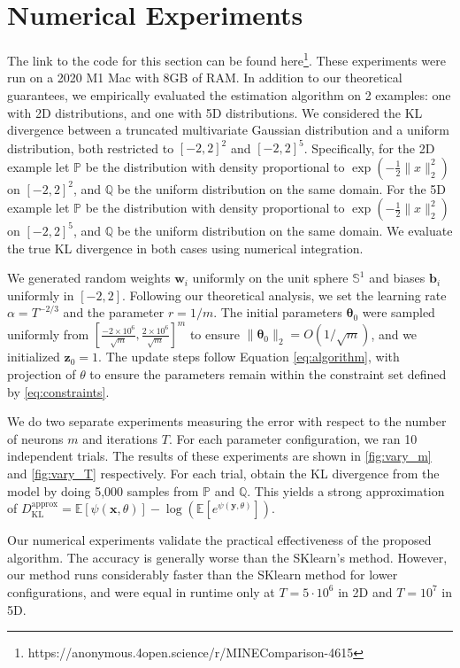 \documentclass[twoside]{article}
\theoremstyle{definition}
\newcommand{\E}{\mathbb{E}}
\newcommand{\Prob}{\mathbb{P}}
\newcommand{\Q}{\mathbb{Q}}
\newcommand{\1}[1]{\scalebox{1.25}{$\mathds{1}$}\left[#1\right]}
\begin{document}
\section{Numerical Experiments}

 The link to the code for this section can be found here\footnote{https://anonymous.4open.science/r/MINEComparison-4615}.  These experiments were run on a 2020 M1 Mac with 8GB of RAM. In addition to our theoretical guarantees, we empirically evaluated the estimation algorithm on 2 examples: one with 2D distributions, and one with 5D distributions. We considered the KL divergence between a truncated multivariate Gaussian distribution and a uniform distribution, both restricted to $[-2,2]^2$ and $[-2,2]^5$. Specifically, for the 2D example let $\mathbb{P}$ be the distribution with density proportional to $\exp(-\frac{1}{2}\|x\|_2^2)$ on $[-2,2]^2$, and $\mathbb{Q}$ be the uniform distribution on the same domain. For the 5D example let $\mathbb{P}$ be the distribution with density proportional to $\exp(-\frac{1}{2}\|x\|_2^2)$ on $[-2,2]^5$, and $\mathbb{Q}$ be the uniform distribution on the same domain. We evaluate the true KL divergence in both cases using numerical integration.

 We generated random weights $\bm{w}_i$ uniformly on the unit sphere $\mathbb{S}^{1}$ and biases $\bm{b}_i$ uniformly in $[-2,2]$. Following our theoretical analysis, we set the learning rate $\alpha = T^{-2/3}$ and the parameter $r = 1/m$. The initial parameters $\bm{\theta}_0$ were sampled uniformly from $\left[\frac{-2\times 10^{6}}{\sqrt{m}}, \frac{2\times 10^6}{\sqrt{m}}\right]^m$ to ensure $\|\bm{\theta}_0\|_2 = O(1/\sqrt{m})$, and we initialized $\bm{z}_0 = 1$. The update steps follow Equation \eqref{eq:algorithm}, with projection of $\theta$ to ensure the parameters remain within the constraint set defined by \eqref{eq:constraints}. 
 
 We do two separate experiments measuring the error with respect to the number of neurons $m$ and iterations $T$. For each parameter configuration, we ran 10 independent trials. The results of these experiments are shown in \ref{fig:vary_m} and \ref{fig:vary_T} respectively. For each trial, obtain the KL divergence from the model by doing 5,000 samples from $\Prob$ and $\Q$. This yields a strong approximation of $D_{\text{KL}}^{\text{approx}} =\E[\psi(\bm{x},\theta)] - \log(\E[e^{\psi(\bm{y},\theta)}]).$

Our numerical experiments validate the practical effectiveness of the proposed algorithm. The accuracy is generally worse than the SKlearn's method. However, our method runs considerably faster than the SKlearn method for lower configurations, and were equal in runtime only at $T=5\cdot 10^6$ in 2D and $T=10^7$ in 5D. 
\end{document}
